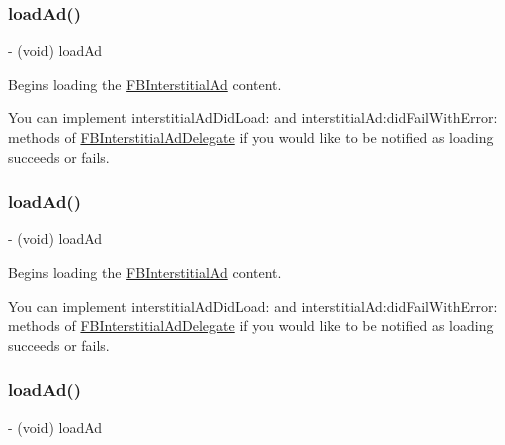 \subsubsection{\texorpdfstring{load\+Ad()}{loadAd()}\hspace{0.1cm}{\footnotesize\ttfamily [3/5]}}
{\footnotesize\ttfamily -\/ (void) load\+Ad \begin{DoxyParamCaption}{ }\end{DoxyParamCaption}}

Begins loading the \hyperlink{interfaceFBInterstitialAd}{F\+B\+Interstitial\+Ad} content.

You can implement {\ttfamily interstitial\+Ad\+Did\+Load\+:} and {\ttfamily interstitial\+Ad\+:did\+Fail\+With\+Error\+:} methods of {\ttfamily \hyperlink{classFBInterstitialAdDelegate-p}{F\+B\+Interstitial\+Ad\+Delegate}} if you would like to be notified as loading succeeds or fails. \mbox{\label{interfaceFBInterstitialAd_a4bbd516a1c5f381ab7af76c2e113fd86}} 
\subsubsection{\texorpdfstring{load\+Ad()}{loadAd()}\hspace{0.1cm}{\footnotesize\ttfamily [4/5]}}
{\footnotesize\ttfamily -\/ (void) load\+Ad \begin{DoxyParamCaption}{ }\end{DoxyParamCaption}}

Begins loading the \hyperlink{interfaceFBInterstitialAd}{F\+B\+Interstitial\+Ad} content.

You can implement {\ttfamily interstitial\+Ad\+Did\+Load\+:} and {\ttfamily interstitial\+Ad\+:did\+Fail\+With\+Error\+:} methods of {\ttfamily \hyperlink{classFBInterstitialAdDelegate-p}{F\+B\+Interstitial\+Ad\+Delegate}} if you would like to be notified as loading succeeds or fails. \mbox{\label{interfaceFBInterstitialAd_a4bbd516a1c5f381ab7af76c2e113fd86}} 
\subsubsection{\texorpdfstring{load\+Ad()}{loadAd()}\hspace{0.1cm}{\footnotesize\ttfamily [5/5]}}
{\footnotesize\ttfamily -\/ (void) load\+Ad \begin{DoxyParamCaption}{ }\end{DoxyParamCaption}}

